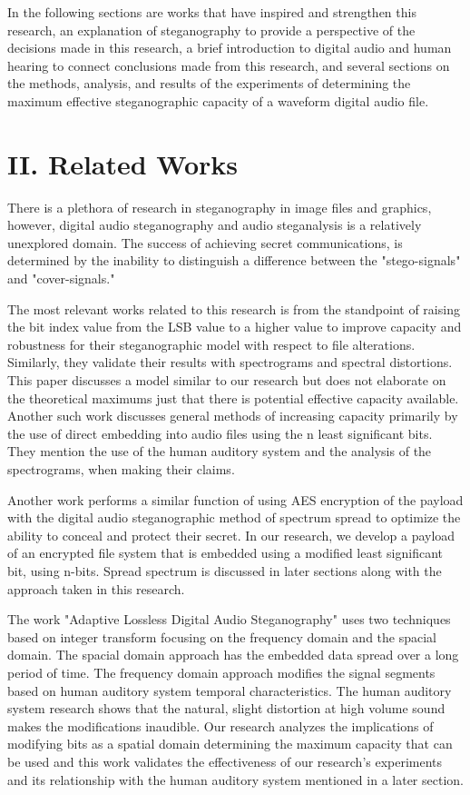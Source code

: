 \documentclass[letterpaper]{article}
\begin{document}
In the following sections are works that have inspired and strengthen this research, an explanation of steganography to provide a perspective of the decisions made in this research, a brief introduction to digital audio and human hearing to connect conclusions made from this research, and several sections on the methods, analysis, and results of the experiments of determining the maximum effective steganographic capacity of a waveform digital audio file. 

\section{II. Related Works}
There is a plethora of research in steganography in image files and graphics, however, digital audio steganography and audio steganalysis is a relatively unexplored domain. The success of achieving secret communications, is determined by the inability to distinguish a difference between the "stego-signals" and "cover-signals." \cite{avcibas2006audio}
	
The most relevant works related to this research is from the standpoint of raising the bit index value from the LSB value to a higher value to improve capacity and robustness for their steganographic model with respect to file alterations. Similarly, they validate their results with spectrograms and spectral distortions. \cite{gopalan2015imperceptible} This paper discusses a model similar to our research but does not elaborate on the theoretical maximums just that there is potential effective capacity available. Another such work discusses general methods of increasing capacity primarily by the use of direct embedding into audio files using the n least significant bits.\cite{cvejic2002increasing} They mention the use of the human auditory system and the analysis of the spectrograms, when making their claims.

Another work performs a similar function of using AES encryption of the payload with the digital audio steganographic method of spectrum spread to optimize the ability to conceal and protect their secret. \cite{khan2011optimized}  In our research, we develop a payload of an encrypted file system that is embedded using a modified least significant bit, using n-bits. Spread spectrum is discussed in later sections along with the approach taken in this research.

The work "Adaptive Lossless Digital Audio Steganography" uses two techniques based on integer transform focusing on the frequency domain and the spacial domain. The spacial domain approach has the embedded data spread over a long period of time. The frequency domain approach modifies the signal segments based on human auditory system temporal characteristics. The human auditory system research shows that the natural, slight distortion at high volume sound makes the modifications inaudible. \cite{1599886} Our research analyzes the implications of modifying bits as a spatial domain determining the maximum capacity that can be used and this work validates the effectiveness of our research's experiments and its relationship with the human auditory system mentioned in a later section. 
\end{document}
